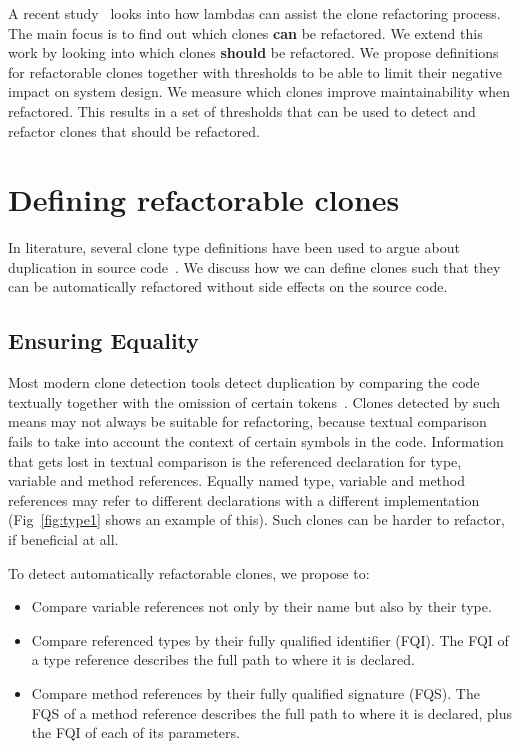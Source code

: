 \documentclass[sigconf,review, table]{acmart}
\begin{document}
A recent study~\cite{tsantalis2017clone} looks into how lambdas can assist the clone refactoring process. The main focus is to find out which clones \textbf{can} be refactored. We extend this work by looking into which clones \textbf{should} be refactored. We propose definitions for refactorable clones together with thresholds to be able to limit their negative impact on system design. We measure which clones improve maintainability when refactored. This results in a set of thresholds that can be used to detect and refactor clones that should be refactored.

\section{Defining refactorable clones}
In literature, several clone type definitions have been used to argue about duplication in source code~\cite{roy2007survey}. We discuss how we can define clones such that they can be automatically refactored without side effects on the source code.

\subsection{Ensuring Equality}\label{sec:t1r}
Most modern clone detection tools detect duplication by comparing the code textually together with the omission of certain tokens~\cite{roy2009comparison, svajlenko2014evaluating}. Clones detected by such means may not always be suitable for refactoring, because textual comparison fails to take into account the context of certain symbols in the code. Information that gets lost in textual comparison is the referenced declaration for type, variable and method references. Equally named type, variable and method references may refer to different declarations with a different implementation (Fig~\ref{fig:type1} shows an example of this). Such clones can be harder to refactor, if beneficial at all.

To detect automatically refactorable clones, we propose to:
\begin{itemize}
  \item Compare variable references not only by their name but also by their type.
  \item Compare referenced types by their fully qualified identifier (FQI). The FQI of a type reference describes the full path to where it is declared.
  \item Compare method references by their fully qualified signature (FQS). The FQS of a method reference describes the full path to where it is declared, plus the FQI of each of its parameters.
\end{itemize}
\end{document}
